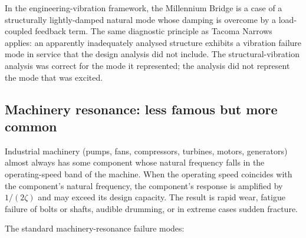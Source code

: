 In the engineering-vibration framework, the Millennium Bridge is a
case of a structurally lightly-damped natural mode whose damping is
overcome by a load-coupled feedback term. The same diagnostic
principle as Tacoma Narrows applies: an apparently inadequately
analysed structure exhibits a vibration failure mode in service that
the design analysis did not include. The structural-vibration
analysis was correct for the mode it represented; the analysis did
not represent the mode that was excited.

\subsection{Machinery resonance: less famous but more common}

Industrial machinery (pumps, fans, compressors, turbines, motors,
generators) almost always has some component whose natural
frequency falls in the operating-speed band of the machine. When the
operating speed coincides with the component's natural frequency,
the component's response is amplified by $1/(2\zeta)$ and may
exceed its design capacity. The result is rapid wear, fatigue
failure of bolts or shafts, audible drumming, or in extreme cases
sudden fracture.

The standard machinery-resonance failure modes:

